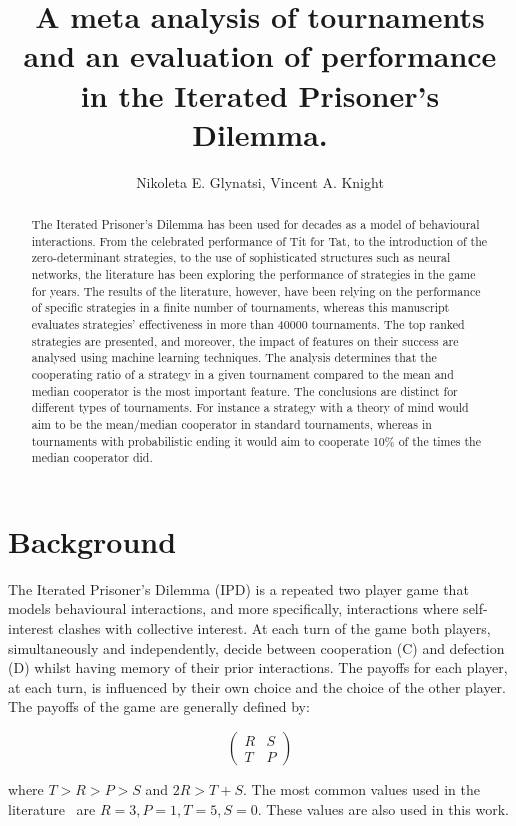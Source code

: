 \documentclass{article}
\title{A meta analysis of tournaments and an evaluation of performance in the
Iterated Prisoner's Dilemma.}
\author{Nikoleta E. Glynatsi, Vincent A. Knight}
\date{}
\newcommand{\numberofstrategies}{}
\begin{document}
\maketitle

\begin{abstract}
The Iterated Prisoner's Dilemma has been used for decades as a model of
behavioural interactions. From the celebrated performance of Tit for Tat, to the
introduction of the zero-determinant strategies, to the use of sophisticated
structures such as neural networks, the literature has been exploring the
performance of strategies in the game for years. The results of the literature,
however, have been relying on the performance of specific strategies in a finite
number of tournaments, whereas this manuscript evaluates
\numberofstrategies strategies' effectiveness in more than 40000 tournaments.
The top ranked strategies are presented, and moreover, the impact of features on
their success are analysed using machine learning techniques. The analysis
determines that the cooperating ratio of a
strategy in a given tournament compared to the mean and median cooperator is the
most important feature. The conclusions are distinct for different types of
tournaments. For instance a strategy with a theory of mind would aim to be the mean/median
cooperator in standard tournaments, whereas in tournaments with probabilistic
ending it would aim to cooperate 10\% of the times the median cooperator did.
\end{abstract}

\section{Background}

The Iterated Prisoner's Dilemma (IPD) is a repeated two player game that models
behavioural interactions, and more specifically, interactions where
self-interest clashes with collective interest. At each turn of the game both
players, simultaneously and independently, decide between cooperation (C) and
defection (D) whilst having memory of their prior interactions. The payoffs for each
player, at each turn, is influenced by their own choice and the choice of the
other player. The payoffs of the game are generally defined by:

\[\begin{pmatrix}
R & S \\
T & P
\end{pmatrix}\]

where \(T > R > P > S\) and \(2R > T + S\). The most common values used in
the literature~\cite{Axelrod1981} are $R=3, P=1, T=5, S=0$. These values are also
used in this work.
\end{document}
